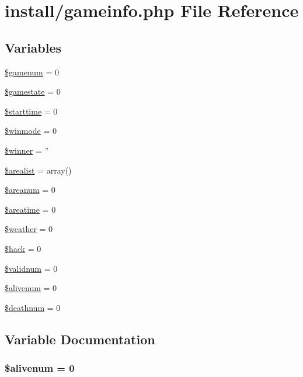 \hypertarget{install_2gameinfo_8php}{\section{install/gameinfo.php File Reference}
\label{install_2gameinfo_8php}
}
\subsection*{Variables}
\begin{DoxyCompactItemize}
\item 
\hyperlink{install_2gameinfo_8php_a98c5bf2ec517c70a0b24d0486da99fbf}{\$gamenum} = 0
\item 
\hyperlink{install_2gameinfo_8php_a3d9f29a8eb6c28b1e2a35cc7a6c61baa}{\$gamestate} = 0
\item 
\hyperlink{install_2gameinfo_8php_af757b2eb3e5f4761dd88804929e413ea}{\$starttime} = 0
\item 
\hyperlink{install_2gameinfo_8php_afe89a6c5b88f243cfb7699a60ed3e0f3}{\$winmode} = 0
\item 
\hyperlink{install_2gameinfo_8php_ad92744668d7f5e7b2ee5b87fe8a845f2}{\$winner} = ''
\item 
\hyperlink{install_2gameinfo_8php_a692d2363b048bb3fcdb65bf6bde8d9e6}{\$arealist} = array()
\item 
\hyperlink{install_2gameinfo_8php_a23e1b0df49f9669284a6b829a473a53c}{\$areanum} = 0
\item 
\hyperlink{install_2gameinfo_8php_a09c35ae4cf3040a5cd4d20a69f894015}{\$areatime} = 0
\item 
\hyperlink{install_2gameinfo_8php_a7c88c8dfcf14e98d581073a25966ec09}{\$weather} = 0
\item 
\hyperlink{install_2gameinfo_8php_a3403384c1a586a131e24cd874485de0a}{\$hack} = 0
\item 
\hyperlink{install_2gameinfo_8php_a54f1a166645794ce06e05051071a0d53}{\$validnum} = 0
\item 
\hyperlink{install_2gameinfo_8php_af96bde4637269c1f0053ba4ac66a8f87}{\$alivenum} = 0
\item 
\hyperlink{install_2gameinfo_8php_ac8cccc0e21ebd6828150700b1436a5f8}{\$deathnum} = 0
\end{DoxyCompactItemize}


\subsection{Variable Documentation}
\hypertarget{install_2gameinfo_8php_af96bde4637269c1f0053ba4ac66a8f87}{
\subsubsection[{\$alivenum}]{\setlength{\rightskip}{0pt plus 5cm}\$alivenum = 0}}\label{install_2gameinfo_8php_af96bde4637269c1f0053ba4ac66a8f87}


